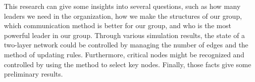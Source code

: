 \begin{bigabstract}
This research can give some insights into several questions, such as how many leaders we need in the organization, how we make the structures of our group, which communication method is better for our group, and who is the most powerful leader in our group. Through various simulation results, the state of a two-layer network could be controlled by managing the number of edges and the method of updating rules. Furthermore, critical nodes might be recognized and controlled by using the method to select key nodes. Finally, those facts give some preliminary results.\\ 

\end{bigabstract}